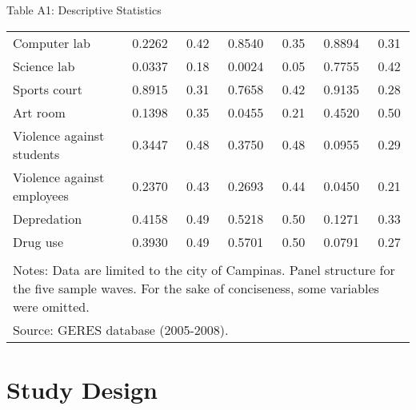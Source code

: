 \documentclass{beamer}
\begin{document}
\begin{frame}{Table A1: Descriptive Statistics}
\begin{adjustbox}{max width=\textwidth}
\begin{tabular}{l*{3}{cc}}
Computer lab        &      0.2262&        0.42&      0.8540&        0.35&      0.8894&        0.31\\
Science lab         &      0.0337&        0.18&      0.0024&        0.05&      0.7755&        0.42\\
Sports court        &      0.8915&        0.31&      0.7658&        0.42&      0.9135&        0.28\\
Art room            &      0.1398&        0.35&      0.0455&        0.21&      0.4520&        0.50\\
Violence against students&      0.3447&        0.48&      0.3750&        0.48&      0.0955&        0.29\\
Violence against employees &      0.2370&        0.43&      0.2693&        0.44&      0.0450&        0.21 \\
Depredation         &      0.4158&        0.49&      0.5218&        0.50&      0.1271&        0.33\\
Drug use            &      0.3930&        0.49&      0.5701&        0.50&      0.0791&        0.27 \vspace{-4pt} \\
\bottomrule
\vspace{-18pt} \\
\multicolumn{7}{l}{\tiny Notes: Data are limited to the city of Campinas. Panel structure for the five sample waves. For the sake of conciseness, some variables were omitted.}\vspace{-8pt} \\
\multicolumn{7}{l}{\tiny Source: GERES database (2005-2008).}\\
\end{tabular}
\end{adjustbox}
\end{frame} 



\section{Study Design}
\end{document}
